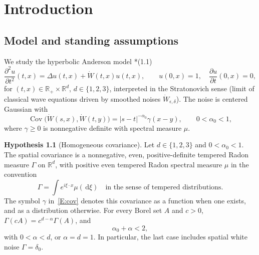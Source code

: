 \documentclass[12pt,oneside,openany]{book}
\numberwithin{equation}{section}
\theoremstyle{nogostyle}
\theoremstyle{definition}
\newtheorem{hypothesis}[theorem]{Hypothesis}
\newcommand{\R}{\mathbb{R}}
\newcommand{\W}{\dot W}
\newcommand{\ud}{\,\mathrm{d}}
\begin{document}
\mainmatter

\chapter{Introduction}\label{S:book-setting}





\section{Model and standing assumptions}\label{S:model}

We study the hyperbolic Anderson model
\cite{chen:author2026:time-dependency}*{(1.1)}
\begin{equation}\label{E:HAM}
  \frac{\partial^2 u}{\partial t^2}(t,x)=\Delta u(t,x)+\W(t,x)u(t,x),
  \qquad u(0,x)=1,\quad \frac{\partial u}{\partial t}(0,x)=0,
\end{equation}
for $(t,x) \in \R_+\times\R^d$, $d \in \{1,2,3\}$, interpreted in the
Stratonovich sense (limit of classical wave equations driven by smoothed noises
$\W_{\epsilon,\delta}$). The noise is centered Gaussian with
\begin{equation}\label{E:cov}
  \operatorname{Cov}\big(\W(s,x),\W(t,y)\big)=|s-t|^{-\alpha_0}\gamma(x-y),
  \qquad 0<\alpha_0<1,
\end{equation}
where $\gamma \ge 0$ is nonnegative definite with spectral measure $\mu$.

\begin{hypothesis}[Homogeneous covariance]\label{H:homog}
  Let $d \in \{1,2,3\}$ and $0 < \alpha_0 < 1$. The spatial covariance is a
  nonnegative, even, positive-definite tempered Radon measure $\Gamma$ on
  $\R^d$, with positive even tempered Radon spectral measure $\mu$ in the
  convention
  \[
    \Gamma=\int e^{i\xi\cdot x}\mu(\ud\xi)
    \quad\text{in the sense of tempered distributions}.
  \]
  The symbol $\gamma$ in~\eqref{E:cov} denotes this covariance as a function
  when one exists, and as a distribution otherwise. For every Borel set $A$ and
  $c > 0$, $\Gamma(cA) = c^{d-\alpha}\Gamma(A)$, and
  \begin{equation}\label{E:threshold}
    \alpha_0+\alpha<2,
  \end{equation}
  with $0 < \alpha < d$, or $\alpha = d = 1$. In particular, the last case
  includes spatial white noise $\Gamma = \delta_0$.
\end{hypothesis}
\end{document}
